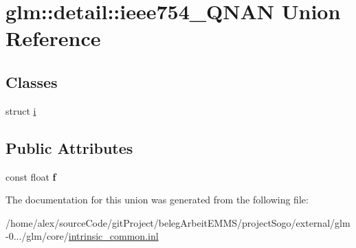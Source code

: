 \hypertarget{unionglm_1_1detail_1_1ieee754__QNAN}{\section{glm\-:\-:detail\-:\-:ieee754\-\_\-\-Q\-N\-A\-N Union Reference}
\label{unionglm_1_1detail_1_1ieee754__QNAN}
}
\subsection*{Classes}
\begin{DoxyCompactItemize}
\item 
struct \hyperlink{structglm_1_1detail_1_1ieee754__QNAN_1_1i}{i}
\end{DoxyCompactItemize}
\subsection*{Public Attributes}
\begin{DoxyCompactItemize}
\item 
\hypertarget{unionglm_1_1detail_1_1ieee754__QNAN_ac5f04f4e605e4d08ddc2bacddf7eee65}{const float {\bfseries f}}\label{unionglm_1_1detail_1_1ieee754__QNAN_ac5f04f4e605e4d08ddc2bacddf7eee65}

\end{DoxyCompactItemize}


The documentation for this union was generated from the following file\-:\begin{DoxyCompactItemize}
\item 
/home/alex/source\-Code/git\-Project/beleg\-Arbeit\-E\-M\-M\-S/project\-Sogo/external/glm-\/0.../glm/core/\hyperlink{intrinsic__common_8inl}{intrinsic\-\_\-common.\-inl}\end{DoxyCompactItemize}
